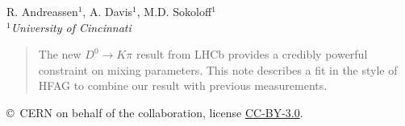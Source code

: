\begin{titlepage}
\vspace*{2.0cm}

\begin{center}
R. Andreassen$^1$, A. Davis$^1$, M.D. Sokoloff$^1$\\
$^1$\textit{University of Cincinnati}
\end{center}

\vspace{\fill}

\begin{abstract}
  \noindent
  The new $D^0\to K\pi$ result from LHCb provides a credibly powerful constraint
  on mixing parameters. This note describes a fit in the style of HFAG to combine 
  our result with previous measurements. 
\end{abstract}

\vspace*{2.0cm}


\vspace{\fill}

{\footnotesize 
\centerline{\copyright~CERN on behalf of the \lhcb collaboration, license \href{http://creativecommons.org/licenses/by/3.0/}{CC-BY-3.0}.}}
\vspace*{2mm}

\end{titlepage}










\cleardoublepage







